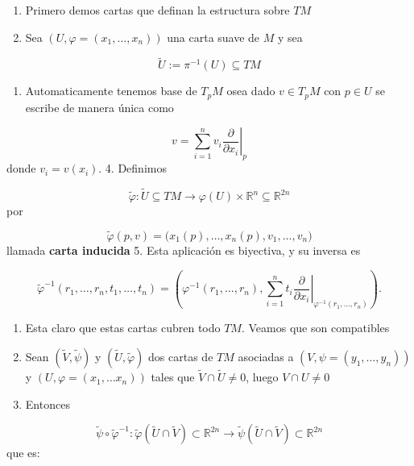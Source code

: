 \begin{bookproof}{}
\begin{enumerate}
\item Primero demos cartas que definan la estructura sobre $TM$
\item Sea $(U,\varphi=(x_1,\dots,x_n))$ una carta suave de $M$ y sea
\end{enumerate}
\[
\widetilde U:=\pi^{-1}(U)\subseteq TM
\]
\begin{enumerate}[start=3]
\item Automaticamente tenemos base de $T_{p}M$ osea dado $v\in T_pM$ con $p\in U$ se escribe de manera única como
\end{enumerate}
\[
v=\sum_{i=1}^n v_i\left.\frac{\partial}{\partial x_i}\right|_p
\]
donde $v_i=v(x_i)$. 4. Definimos

\[
\widetilde\varphi:\widetilde U\subseteq TM\to\varphi(U)\times\mathbb R^n\subseteq\mathbb R^{2n}
\]
por

\[
\widetilde\varphi(p,v)=\bigl(x_1(p),\dots,x_n(p),v_1,\dots,v_n\bigr)
\]
llamada \textbf{carta inducida} 5. Esta aplicación es biyectiva, y su inversa es

\[
\widetilde\varphi^{-1}(r_1,\dots,r_n,t_1,\dots,t_n)=\left(\varphi^{-1}(r_1,\dots,r_n),\sum_{i=1}^n t_i\left.\frac{\partial}{\partial x_i}\right|_{\varphi^{-1}(r_1,\dots,r_n)}\right).
\]
\begin{enumerate}[start=6]
\item Esta claro que estas cartas cubren todo $TM$. Veamos que son compatibles
\item Sean $(\tilde{V},\tilde{\psi})$ y $(\tilde{U},\tilde{\varphi})$ dos cartas de $TM$ asociadas a $(V,\psi=(y_1,\dots,y_n))$ y $(U,\varphi=(x_{1},\ldots x_{n}))$ tales que $\tilde{V}\cap \tilde{U}\neq 0$, luego $V\cap U\neq0$
\item Entonces
\end{enumerate}
\[
\tilde{\psi}\circ \tilde{\varphi}^{-1}:\tilde{\varphi}(\tilde{U}\cap \tilde{V}) \subset \mathbb{R}^{2n}\longrightarrow\tilde{\psi}(\tilde{U}\cap \tilde{V}) \subset \mathbb{R}^{2n}
\]
que es:


\end{bookproof}
